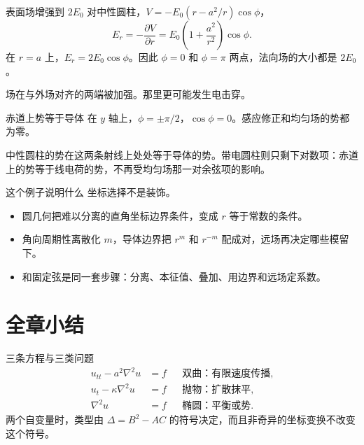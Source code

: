 \documentclass[fontset=windows, chinese, 10pt, xcolor=dvipsnames]{beamer}
\begin{document}
\begin{frame}{表面场增强到 $2E_0$}
  对中性圆柱，$V=-E_0(r-a^2/r)\cos\phi$，
  \begin{equation*}
    E_r=-\frac{\partial V}{\partial r}
    =E_0\left(1+\frac{a^2}{r^2}\right)\cos\phi.
  \end{equation*}
  在 $r=a$ 上，$E_r=2E_0\cos\phi$。因此 $\phi=0$ 和 $\phi=\pi$ 两点，法向场的大小都是 $2E_0$。
  \vspace{0.3em}

  场在与外场对齐的两端被加强。那里更可能发生电击穿。
\end{frame}

\begin{frame}{赤道上势等于导体}
  在 $y$ 轴上，$\phi=\pm\pi/2$，$\cos\phi=0$。感应修正和均匀场的势都为零。
  \vspace{0.3em}

  中性圆柱的势在这两条射线上处处等于导体的势。带电圆柱则只剩下对数项：赤道上的势等于线电荷的势，不再受均匀场那一对余弦项的影响。
\end{frame}

\begin{frame}{这个例子说明什么}
  坐标选择不是装饰。
  \begin{itemize}
    \item 圆几何把难以分离的直角坐标边界条件，变成 $r$ 等于常数的条件。
    \item 角向周期性离散化 $m$，导体边界把 $r^{m}$ 和 $r^{-m}$ 配成对，远场再决定哪些模留下。
    \item 和固定弦是同一套步骤：分离、本征值、叠加、用边界和远场定系数。
  \end{itemize}
\end{frame}

\section{全章小结}

\begin{frame}{三条方程与三类问题}
  \begin{align*}
    u_{tt}-a^2\nabla^2 u&=f
      && \text{双曲：有限速度传播},\\
    u_t-\kappa\nabla^2 u&=f
      && \text{抛物：扩散抹平},\\
    \nabla^2 u&=f
      && \text{椭圆：平衡或势}.
  \end{align*}
  两个自变量时，类型由 $\Delta=B^2-AC$ 的符号决定，而且非奇异的坐标变换不改变这个符号。
\end{frame}
\end{document}
